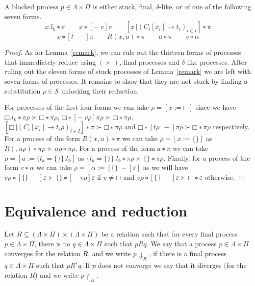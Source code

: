 \begin{lemma}\label{possibilities}
  A blocked process $p ∈ Λ×Π$ is either stuck, final, $δ$-like, or of one of
  the following seven forms.
  $$
    x.l_k ∗ π
    \quad\quad
    x ∗ [{-}\;v]π
    \quad\quad
    [x\,| (C_i[x_i] → t_i)_{i∈I}] ∗ π
  $$
  $$
    x ∗ [t\;\,{-}]π
    \quad\quad
    R(x,u) ∗ π
    \quad\quad
    a ∗ π
    \quad\quad
    v ∗ α
  $$
  \begin{proof}
    As for Lemma~\ref{remark}, we can rule out the thirteen forms of
    processes that immediately reduce using $(≻)$, final processes and
    $δ$-like processes. After ruling out the eleven forms of stuck processes
    of Lemma~\ref{remark} we are left with seven forms of processes. It
    remains to show that they are not stuck by finding a substitution
    $ρ ∈ \mathcal{S}$ unlocking their reduction.

    For processes of the first four forms we can take $ρ = [x := □]$
    since we have $□.l_k ∗ πρ ≻ □ ∗ πρ$, $□ ∗ [{-}\;vρ]πρ ≻ □ ∗ πρ$,
    $[□\,| (C_i[x_i] → t_iρ)_{i∈I}] ∗ π ≻ □ ∗ πρ$ and
    $□ ∗ [tρ\;\,{-}]πρ ≻ □ ∗ πρ$ respectively.
    For a process of the form $R(x,u) ∗ π$ we can take $ρ = [x := \{\}]$ as
    $R({},uρ) ∗ πρ ≻ uρ ∗ πρ$.
    For a process of the form $a ∗ π$ we can take
    $ρ = [a := \{l_k = \{\}\}.l_k]$ as $\{l_k = \{\}\}.l_k ∗ πρ ≻ \{\} ∗ πρ$.
    Finally, for a process of the form $v ∗ α$ we can take
    $ρ = [α := [\{\}\;{-}]ε]$ as we will have
    $vρ ∗ [\{\}\;{-}]ε ≻ \{\} ∗ [{-}\;vρ]ε$ if $v ≠ □$ and
    $vρ ∗ [\{\}\;{-}]ε ≻ □ ∗ ε$ otherwise.
  \end{proof}
\end{lemma}

\section{Equivalence and reduction}

\begin{definition}
  Let $R ⊆ (Λ×Π) × (Λ×Π)$ be a relation such that for every final
  process $p ∈ Λ×Π$, there is no $q ∈ Λ×Π$ such that $p R q$. We
  say that a process $p ∈ Λ×Π$ converges for the relation $R$,
  and we write $p {⇓}_R$, if there is a final process $q ∈ Λ×Π$
  such that $p R^{∗} q$. If $p$ does not converge we say that it
  diverges (for the relation $R$) and we write $p {⇑}_R$.
\end{definition}

